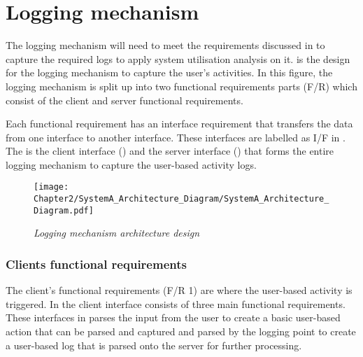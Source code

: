 \section{Logging mechanism}\label{Ch2:LoggingMechanism} The logging mechanism will need to meet the requirements discussed in  to capture the required logs to apply system utilisation analysis on it.  is the design for the logging mechanism to capture the user's activities. In this figure, the logging mechanism is split up into two functional requirements parts (F/R) which consist of the client and server functional requirements.\par Each functional requirement has an interface requirement that transfers the data from one interface to another interface. These interfaces are labelled as I/F in . The  is the client interface () and the server interface () that forms the entire logging mechanism to capture the user-based activity logs.

\begin{figure}[!htb] %
	\centering %
	\texttt{[image: Chapter2/SystemA\_Architecture\_Diagram/SystemA\_Architecture\_Diagram.pdf]}
	\caption[Logging mechanism architecture design]
	{\textit{Logging mechanism architecture design}}\label{fig:ch2_systemDesign}
\end{figure}

\subsubsection{Clients functional requirements}
The client's functional requirements (F/R 1) are where the user-based activity is triggered. In  the client interface consists of three main functional requirements. These interfaces in  parses the input from the user to create a basic user-based action that can be parsed and captured and parsed by the logging point to create a user-based log that is parsed onto the server for further processing.

